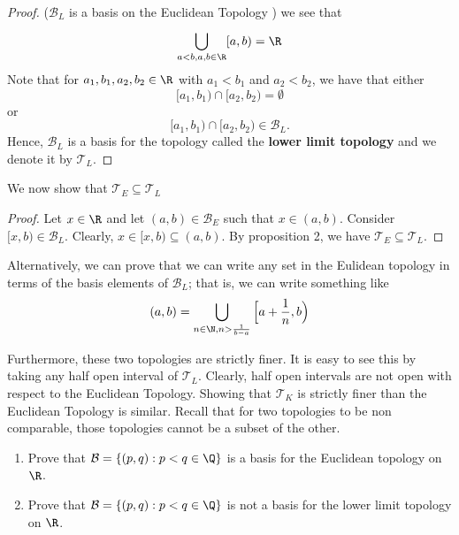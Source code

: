 \begin{proof}(\( \mathcal{B}_L  \) is a basis on the Euclidean Topology )
    we see that 
\[  \bigcup_{ a < b , a,b \in \R  }^{  }  [a,b) = \R  \]
Note that for \( {a}_{1}, {b}_{1}, {a}_{2}, {b}_{2} \in \R  \) with \( {a}_{1} < {b}_{1} \) and \( {a}_{2} < {b}_{2} \), we have that either 
\[  [{a}_{1}, {b}_{1}) \cap [{a}_{2}, {b}_{2}) = \emptyset  \]
or 
\[  [{a}_{1}, {b}_{1}) \cap [{a}_{2}, {b}_{2}) \in {\mathcal{B}}_{L}. \]
Hence, \( {\mathcal{B}}_{L} \) is a basis for the topology called the \textbf{lower limit topology} and we denote it by \( {\mathcal{T}}_{L} \).
\end{proof}
We now show that \( {\mathcal{T}}_{E} \subseteq {\mathcal{T}}_{L} \)
\begin{proof}
    Let \( x \in \R  \) and let \( (a,b) \in {\mathcal{B}}_{E} \) such that \( x \in (a,b) \). Consider \( [x,b) \in {\mathcal{B}}_{L} \). Clearly, \( x \in [x,b) \subseteq (a,b) \). By proposition 2, we have \( {\mathcal{T}}_{E} \subseteq {\mathcal{T}}_{L} \).
\end{proof}

Alternatively, we can prove that we can write any set in the Eulidean topology in terms of the basis elements of \( \mathcal{B}_L  \); that is, we can write something like
\[  (a,b) = \bigcup_{ n \in \N , n > \frac{ 1 }{  b - a  }   }^{  }  \Big[a + \frac{ 1 }{ n }, b \Big) \]

Furthermore, these two topologies are strictly finer. It is easy to see this by taking any half open interval of \( {\mathcal{T}}_{L} \). Clearly, half open intervals are not open with respect to the Euclidean Topology. Showing that \( {\mathcal{T}}_{K} \) is strictly finer than the Euclidean Topology is similar. Recall that for two topologies to be non comparable, those topologies cannot be a subset of the other.
\begin{problem}
    \begin{enumerate}
        \item[(1)] Prove that \( \mathcal{B} = \{ (p,q) : p < q  \in \Q  \}  \) is a basis for the Euclidean topology on \( \R  \).
        \item[(2)] Prove that \( \mathcal{B} = \{ (p,q) : p < q  \in \Q  \}  \) is not a basis for the lower limit topology on \( \R  \).
    \end{enumerate}
\end{problem}


